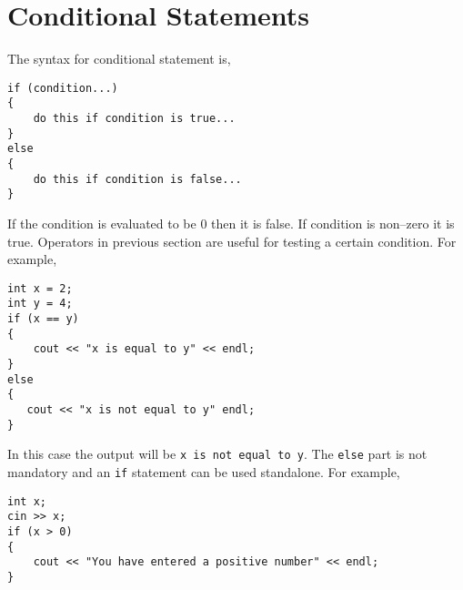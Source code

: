 \documentclass[12pt,a4paper]{article}
\begin{document}
\section{Conditional Statements}
The syntax for conditional statement is,
\begin{lstlisting}
if (condition...)
{
    do this if condition is true...
}
else
{
    do this if condition is false...
}
\end{lstlisting}
If the condition is evaluated to be 0 then it is false. If condition is non--zero it is true.
Operators in previous section are useful for testing a certain condition. For example,
\begin{lstlisting}
int x = 2;
int y = 4;
if (x == y)
{
    cout << "x is equal to y" << endl;
}
else
{
   cout << "x is not equal to y" endl;
}
\end{lstlisting}
In this case the output will be \verb|x is not equal to y|. The \verb|else| part is not mandatory and an \verb|if| statement can be used standalone. For example,
\begin{lstlisting}
int x;
cin >> x;
if (x > 0)
{
    cout << "You have entered a positive number" << endl;
}
\end{lstlisting}
\end{document}
